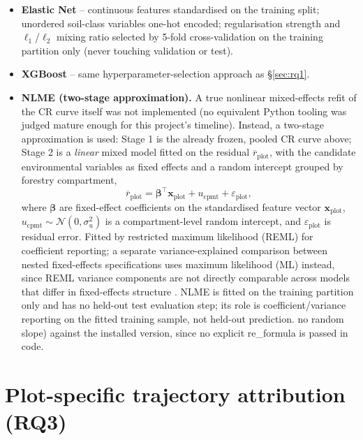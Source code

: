 \begin{itemize}
\setlength\itemsep{0pt}
\item \textbf{Elastic Net} -- continuous features standardised on the training split; unordered
  soil-class variables one-hot encoded; regularisation strength and $\ell_1$/$\ell_2$ mixing
  ratio selected by 5-fold cross-validation on the training partition only (never touching
  validation or test).
\item \textbf{XGBoost} -- same hyperparameter-selection approach as \S\ref{sec:rq1}.
\item \textbf{NLME (two-stage approximation).} A true nonlinear mixed-effects refit of the CR
  curve itself was not implemented (no equivalent Python tooling was judged mature enough for
  this project's timeline). Instead, a two-stage approximation is used: Stage 1 is the already
  frozen, pooled CR curve above; Stage 2 is a \emph{linear} mixed model fitted on the residual
  $\overline{r}_{\text{plot}}$, with the candidate environmental variables as fixed effects and a
  random intercept grouped by forestry compartment,
  \begin{equation}
  \overline{r}_{\text{plot}} = \boldsymbol{\beta}^{\top}\mathbf{x}_{\text{plot}} +
  u_{\text{cpmt}} + \varepsilon_{\text{plot}},
  \label{eq:nlme}
  \end{equation}
  where $\boldsymbol{\beta}$ are fixed-effect coefficients on the standardised feature vector
  $\mathbf{x}_{\text{plot}}$, $u_{\text{cpmt}}\sim\mathcal{N}(0,\sigma_u^2)$ is a compartment-level
  random intercept, and $\varepsilon_{\text{plot}}$ is residual error. Fitted by restricted
  maximum likelihood (REML) for coefficient reporting; a separate variance-explained comparison
  between nested fixed-effects specifications uses maximum likelihood (ML) instead, since REML
  variance components are not directly comparable across models that differ in fixed-effects
  structure \citep{pinheiro2000}. %
  NLME is fitted on the training partition only and has no held-out test evaluation step; its
  role is coefficient/variance reporting on the fitted training sample, not held-out prediction.
  no random slope) against the installed version, since no explicit re\_formula is passed in code.
\end{itemize}

\section{Plot-specific trajectory attribution (RQ3)}
\label{sec:rq3}

